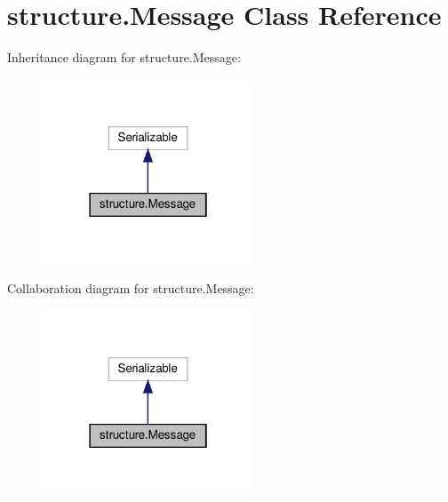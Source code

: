 \hypertarget{classstructure_1_1_message}{}\section{structure.\+Message Class Reference}
\label{classstructure_1_1_message}


Inheritance diagram for structure.\+Message\+:
\nopagebreak
\begin{figure}[H]
\begin{center}
\leavevmode
\includegraphics[width=178pt]{classstructure_1_1_message__inherit__graph}
\end{center}
\end{figure}


Collaboration diagram for structure.\+Message\+:
\nopagebreak
\begin{figure}[H]
\begin{center}
\leavevmode
\includegraphics[width=178pt]{classstructure_1_1_message__coll__graph}
\end{center}
\end{figure}
